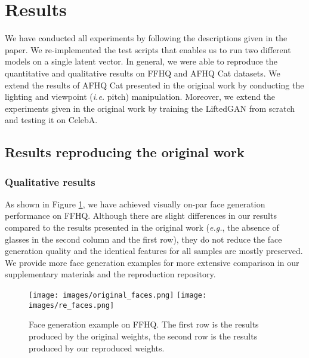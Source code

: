 \section{Results}
\label{sec:results}

We have conducted all experiments by following the descriptions given in the paper. We re-implemented the test scripts that enables us to run two different models on a single latent vector. In general, we were able to reproduce the quantitative and qualitative results on FFHQ and AFHQ Cat datasets. We extend the results of AFHQ Cat presented in the original work by conducting the lighting and viewpoint (\textit{i.e.} pitch) manipulation. Moreover, we extend the experiments given in the original work by training the LiftedGAN from scratch and testing it on CelebA.


\subsection{Results reproducing the original work}
\subsubsection{Qualitative results}

As shown in Figure \ref{fig:original_vs_re_faces}, we have achieved visually on-par face generation performance on FFHQ. Although there are slight differences in our results compared to the results presented in the original work (\textit{e.g.}, the absence of glasses in the second column and the first row), they do not reduce the face generation quality and the identical features for all samples are mostly preserved. We provide more face generation examples for more extensive comparison in our supplementary materials and the reproduction repository.

\begin{figure}[t!]
    \centering
    \texttt{[image: images/original\_faces.png]}
    \texttt{[image: images/re\_faces.png]}
    
    \caption{Face generation example on FFHQ. The first row is the results produced by the original weights, the second row is the results produced by our reproduced weights.}
    \label{fig:original_vs_re_faces}
\end{figure}

